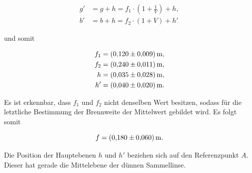 \begin{align*}
g' &= g + h = f_1 \cdot \left(1+\frac{1}{V}\right)+h,\\
b' &= b + h = f_2 \cdot \left(1+V\right)+h'  
\end{align*}

und somit 

\begin{align*}
f_1 &= \SI{0.120+-0.009}{\meter}, \\
f_2 &= \SI{0.240+-0.011}{\meter}, \\
h & = \SI{0.035+-0.028}{\meter},\\
h'&= \SI{0.040+-0.020}{\meter}.
\end{align*}

Es ist erkennbar, dass $f_1$ und $f_2$ nicht denselben Wert besitzen, sodass für die letztliche 
Bestimmung der Brennweite der Mittelwert gebildet wird. Es folgt somit

\begin{equation*}
f = \SI{0.180+-0.060}{\meter}.
\end{equation*}

Die Position der Hauptebenen $h$ und $h'$ beziehen sich auf den Referenzpunkt $A$. Dieser hat gerade die 
Mittelebene der dünnen Sammellinse. 